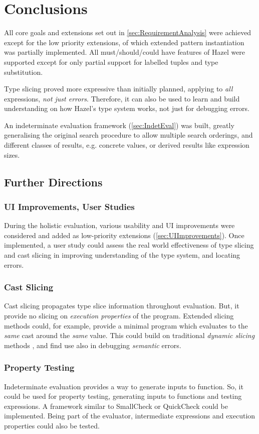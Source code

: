 \chapter{Conclusions}\label{chap:Conclusions}
All core goals and extensions set out in \cref{sec:RequirementAnalysis} were achieved except for the low priority extensions, of which extended pattern instantiation was partially implemented. All must/should/could have features of Hazel were supported except for only partial support for labelled tuples and type substitution.

Type slicing proved more expressive than initially planned, applying to \textit{all} expressions, \textit{not just errors}. Therefore, it can also be used to learn and build understanding on how Hazel's type system works, not just for debugging errors. 

An indeterminate evaluation framework (\cref{sec:IndetEval}) was built, greatly generalising the original search procedure \cite{SearchProc} to allow multiple search orderings, and different classes of results, e.g. concrete values, or derived results like expression sizes.
\section{Further Directions}
\subsection{UI Improvements, User Studies}
During the holistic evaluation, various usability and UI improvements were considered and added as low-priority extensions (\cref{sec:UIImprovements}). Once implemented, a user study could assess the real world effectiveness of type slicing and cast slicing in improving understanding of the type system, and locating errors.

\subsection{Cast Slicing}
Cast slicing propagates type slice information throughout evaluation. But, it provide no slicing on \textit{execution properties} of the program. Extended slicing methods could, for example, provide a minimal program which evaluates to the \textit{same} cast around the \textit{same} value. This could build on traditional \textit{dynamic slicing} methods \cite{DynProgSlice, FunctionalProgExplain}, and find use also in debugging \textit{semantic} errors.

\subsection{Property Testing}
Indeterminate evaluation provides a way to generate inputs to function. So, it could be used for
property testing, generating inputs to functions and testing expressions. A framework similar
to SmallCheck \cite{SmallCheck} or QuickCheck \cite{QuickCheck} could be implemented. Being part of the evaluator,
intermediate expressions and execution properties could also be tested.

